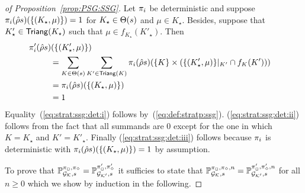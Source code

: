 \begin{proof}[of Proposition~\ref{prop:PSG:SSG}]
  Let $\pi_{i}$ be deterministic and suppose
  $\pi_{i}(\hat{\rho}s)(\{(K_\star,\mu)\})=1$ for $K_\star\in\Theta(s)$ and
  $\mu\in K_\star$.  Besides, suppose that $K'_\star\in\mathsf{Triang}(K_\star)$ such that
  $\mu\in f_{K_\star}(K'_\star)$.  Then
  \begin{align}
    \strat'_{i}(\hat{\rho}s)(\{(K'_\star,\mu)\}) \hspace{-5em}\notag\\
    & =
    \sum_{K\in\psgtrans(s)} \sum_{K'\in\Triang(K)} \strat_{i}(\hat{\rho}s)(\{K\}\times({\{(K'_\star,\mu)\}\sect{K'}}\cap f_K(K')))
    \label{eq:strat:ssg:det:i}\\
    & =
    \strat_{i}(\hat{\rho}s)(\{(K_\star,\mu)\})
    \label{eq:strat:ssg:det:ii}\\
    & =
    1
    \label{eq:strat:ssg:det:iii}
  \end{align}
  Equality~(\ref{eq:strat:ssg:det:i}) follows
  by~(\ref{eq:def:stratp:ssg}). (\ref{eq:strat:ssg:det:ii}) follows
  from the fact that all summands are $0$ except for the one in which
  $K=K_\star$ and $K'=K'_\star$.  Finally (\ref{eq:strat:ssg:det:iii})
  follows because $\pi_{i}$ is deterministic with
  $\pi_{i}(\hat{\rho}s)(\{(K_\star,\mu)\})=1$ by assumption.

  To prove that
  $\mathbb{P}^{\pi_{{\Box}},\pi_{{\Diamond}}}_{{\mathcal{G}_{\mathcal{K}}},s}=\mathbb{P}^{\pi'_{{\Box}},\pi'_{{\Diamond}}}_{{\mathcal{G}_{\mathcal{K}'}},s}$
  it sufficies to state that
  $\mathbb{P}^{\pi_{{\Box}},\pi_{{\Diamond}},n}_{{\mathcal{G}_{\mathcal{K}}},s}=\mathbb{P}^{\pi'_{{\Box}},\pi'_{{\Diamond}},n}_{{\mathcal{G}_{\mathcal{K}'}},s}$
  for all $n\geq0$ which we show by induction in the following.


\end{proof}
